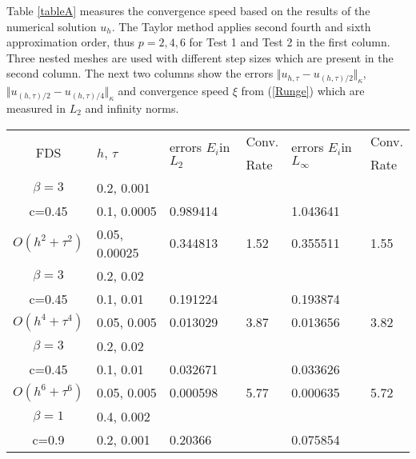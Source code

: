 \documentclass[%
 aip,
cp,  %
 amsmath,amssymb,%
 reprint,%
]{revtex4-2}
\newcommand{\rf}[1]{(\ref{#1})}
\begin{document}
Table \ref{tableA} measures the convergence speed based on the results of the numerical solution $u_h$. The Taylor method applies second fourth and sixth approximation order, thus $p=2,4,6$ for Test 1 and Test 2 in the first column. Three nested meshes are used with different step sizes which are present in the second column. The next two columns show the errors $\Vert u_{h,\tau} - u_{(h,\tau)/2} \Vert_\kappa$, $\Vert  u_{(h,\tau)/2} - u_{(h,\tau)/4} \Vert_\kappa$ and convergence speed $\xi$ from \rf{Runge} which are measured in $L_2$ and infinity norms.
\begin{table}[ht]
\centering
\small
		\begin{tabular}{||c|l|ll|ll||}
			\hline
			\hline
      \multirow{2  }{*}{FDS}        & \multirow{2  }{*}{$h$, $\tau$}  & \multirow{2  }{*}{errors $E_i$in$L_2$}  &Conv.& \multirow{2  }{*}{errors $E_i$in$L_\infty$}  &Conv.  \\
	         &                    &                               & Rate   &                                        & Rate \\
   			\hline 
					\hline 
  $\beta=3$                &0.2, 0.001          &              &              &                     &      \\
   c=0.45                     &0.1, 0.0005          &0.989414 &            &1.043641    &       \\
     $O(h^2 + \tau^ 2)$ &0.05, 0.00025   & 0.344813 & 1.52    &0.355511    &  1.55      \\
			\hline 
  $\beta=3$               &0.2, 0.02       &              &            &                     &      \\
   c=0.45                    &0.1, 0.01      &0.191224 &            &0.193874    &       \\
     $O(h^4+ \tau^4)$ &0.05, 0.005&0.013029 & 3.87   &0.013656     &3.82       \\
			\hline 
  $\beta=3$               &0.2, 0.02       &                &            &                     &      \\
     c=0.45                 &0.1, 0.01        &0.032671 &            &  0.033626    &       \\
     $O(h^6+ \tau^6)$ &0.05, 0.005 &0.000598 &5.77     & 0.000635    & 5.72       \\
	   \hline
			\hline 
       $\beta=1$       &0.4, 0.002        &             &            &           &   \\
                  c=0.9    &0.2, 0.001       &  0.20366   &            &0.075854 &   \\

\end{tabular}
\end{table}
\end{document}
